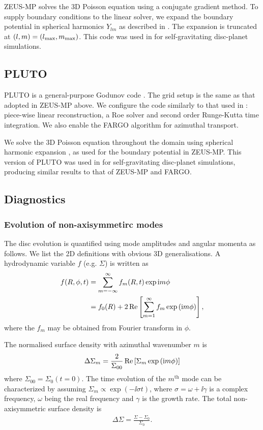 ZEUS-MP solves the 3D Poisson equation using a conjugate gradient
method. To supply boundary conditions to the linear solver, we
expand the boundary potential in spherical harmonics $Y_{lm}$ 
as described in \cite{boss80}. The expansion is truncated at
$(l,m)=(l_\mathrm{max},m_\mathrm{max})$. This code was used in \cite{lin12b} for
self-gravitating disc-planet simulations.  

\subsection{PLUTO} 
PLUTO is a general-purpose Godunov code \citep{mignone07}. The grid
setup is the same as that adopted in ZEUS-MP above. We configure the
code similarly to that used in \cite{lin14}: piece-wise linear
reconstruction, a Roe solver and second order Runge-Kutta time
integration. We also enable the FARGO algorithm for azimuthal
transport. 

We solve the 3D Poisson equation throughout the domain using spherical
harmonic expansion \citep{boss80}, as used for the boundary potential
in ZEUS-MP. This version of PLUTO was used in \cite{lin14b} for
self-gravitating disc-planet simulations, producing similar results to
that of ZEUS-MP and FARGO.   


\subsection{Diagnostics}

\subsubsection{Evolution of non-axisymmetirc modes}
The disc evolution is quantified using mode amplitudes and angular
momenta as follows. We list the 2D definitions with obvious 3D generalisations. 
A hydrodynamic variable $f$ (e.g. $\Sigma$) is written as 
\begin{align}
  f(R,\phi,t) &= \sum_{m=-\infty}^{\infty}f_m(R,t)\exp{\mathrm{i}m \phi} \notag\\
  &= f_0(R) + 2 \operatorname{Re}\left[\sum_{m=1}^\infty f_m \exp{(\mathrm{i}m\phi)}\right], 
\end{align}
where the $f_m$ may be obtained from Fourier transform in $\phi$. 

The normalised surface density with azimuthal wavenumber $m$ is
\begin{align}
  \Delta\Sigma_m = \frac{2}{\Sigma_{00}} \operatorname{Re}\left[\Sigma_m \exp{(\mathrm{i}m\phi)}\right]
\end{align}
where $\Sigma_{00} = \Sigma_0(t=0)$. The time evolution of the
$m^\mathrm{th}$ mode can be characterized by 
assuming $\Sigma_m\propto\exp{(-\ii \sigma t)}$, where
$\sigma = \omega + \ii\gamma$ is a complex frequency, $\omega$ being 
the real frequency and $\gamma$ is the growth rate. The total
non-axisymmetric surface density is 
\begin{align}
  \Delta\Sigma = \frac{\Sigma - \Sigma_0}{\Sigma_0}. 
\end{align}


